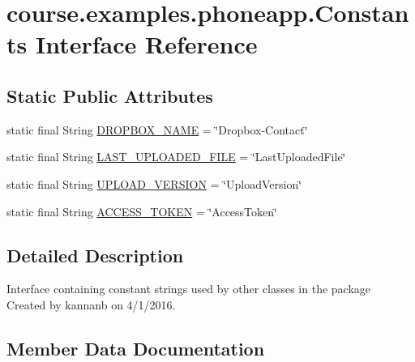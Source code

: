 \hypertarget{interfacecourse_1_1examples_1_1phoneapp_1_1_constants}{}\section{course.\+examples.\+phoneapp.\+Constants Interface Reference}
\label{interfacecourse_1_1examples_1_1phoneapp_1_1_constants}
\subsection*{Static Public Attributes}
\begin{DoxyCompactItemize}
\item 
static final String \hyperlink{interfacecourse_1_1examples_1_1phoneapp_1_1_constants_a81c8d7965ccfbdc655e8c17d126ee76b}{D\+R\+O\+P\+B\+O\+X\+\_\+\+N\+A\+M\+E} = \char`\"{}Dropbox-\/Contact\char`\"{}
\item 
static final String \hyperlink{interfacecourse_1_1examples_1_1phoneapp_1_1_constants_a9f446fa1a8a36fd25ed4dc1a8fd16ab4}{L\+A\+S\+T\+\_\+\+U\+P\+L\+O\+A\+D\+E\+D\+\_\+\+F\+I\+L\+E} = \char`\"{}Last\+Uploaded\+File\char`\"{}
\item 
static final String \hyperlink{interfacecourse_1_1examples_1_1phoneapp_1_1_constants_a192096b4b6c461daa7fc205689ce9713}{U\+P\+L\+O\+A\+D\+\_\+\+V\+E\+R\+S\+I\+O\+N} = \char`\"{}Upload\+Version\char`\"{}
\item 
static final String \hyperlink{interfacecourse_1_1examples_1_1phoneapp_1_1_constants_ad23efab031406085342ae78e3bc59015}{A\+C\+C\+E\+S\+S\+\_\+\+T\+O\+K\+E\+N} = \char`\"{}Access\+Token\char`\"{}
\end{DoxyCompactItemize}


\subsection{Detailed Description}
Interface containing constant strings used by other classes in the package ~\newline
 Created by kannanb on 4/1/2016. 

\subsection{Member Data Documentation}
\hypertarget{interfacecourse_1_1examples_1_1phoneapp_1_1_constants_ad23efab031406085342ae78e3bc59015}{}
